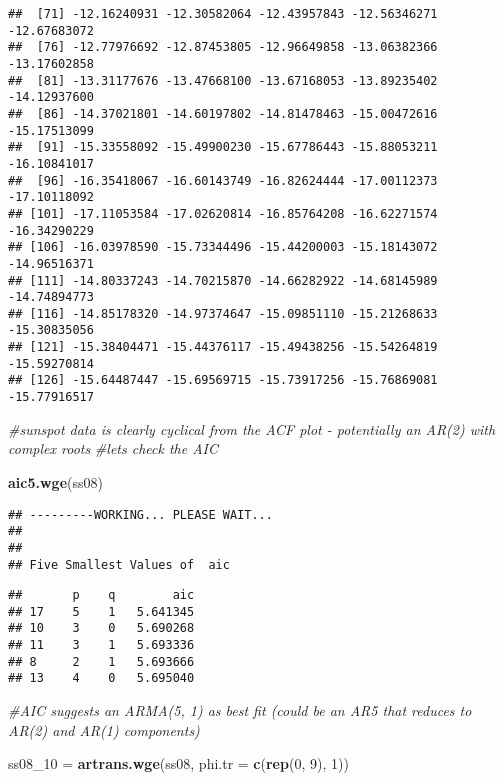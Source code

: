 \documentclass[]{article}
\newenvironment{Shaded}{\begin{snugshade}}{\end{snugshade}}
\newcommand{\CommentTok}[1]{\textcolor[rgb]{0.56,0.35,0.01}{\textit{#1}}}
\newcommand{\DataTypeTok}[1]{\textcolor[rgb]{0.13,0.29,0.53}{#1}}
\newcommand{\DecValTok}[1]{\textcolor[rgb]{0.00,0.00,0.81}{#1}}
\newcommand{\KeywordTok}[1]{\textcolor[rgb]{0.13,0.29,0.53}{\textbf{#1}}}
\newcommand{\NormalTok}[1]{#1}
\newcommand{\StringTok}[1]{\textcolor[rgb]{0.31,0.60,0.02}{#1}}
\begin{document}
\begin{verbatim}
##  [71] -12.16240931 -12.30582064 -12.43957843 -12.56346271 -12.67683072
##  [76] -12.77976692 -12.87453805 -12.96649858 -13.06382366 -13.17602858
##  [81] -13.31177676 -13.47668100 -13.67168053 -13.89235402 -14.12937600
##  [86] -14.37021801 -14.60197802 -14.81478463 -15.00472616 -15.17513099
##  [91] -15.33558092 -15.49900230 -15.67786443 -15.88053211 -16.10841017
##  [96] -16.35418067 -16.60143749 -16.82624444 -17.00112373 -17.10118092
## [101] -17.11053584 -17.02620814 -16.85764208 -16.62271574 -16.34290229
## [106] -16.03978590 -15.73344496 -15.44200003 -15.18143072 -14.96516371
## [111] -14.80337243 -14.70215870 -14.66282922 -14.68145989 -14.74894773
## [116] -14.85178320 -14.97374647 -15.09851110 -15.21268633 -15.30835056
## [121] -15.38404471 -15.44376117 -15.49438256 -15.54264819 -15.59270814
## [126] -15.64487447 -15.69569715 -15.73917256 -15.76869081 -15.77916517
\end{verbatim}

\begin{Shaded}
\begin{Highlighting}[]
\CommentTok{#sunspot data is clearly cyclical from the ACF plot - potentially an AR(2) with complex roots  }
\CommentTok{#lets check the AIC}

\KeywordTok{aic5.wge}\NormalTok{(ss08)}
\end{Highlighting}
\end{Shaded}

\begin{verbatim}
## ---------WORKING... PLEASE WAIT... 
## 
## 
## Five Smallest Values of  aic
\end{verbatim}

\begin{verbatim}
##       p    q        aic
## 17    5    1   5.641345
## 10    3    0   5.690268
## 11    3    1   5.693336
## 8     2    1   5.693666
## 13    4    0   5.695040
\end{verbatim}

\begin{Shaded}
\begin{Highlighting}[]
\CommentTok{#AIC suggests an ARMA(5, 1) as best fit (could be an AR5 that reduces to AR(2) and AR(1) components)}

\NormalTok{ss08_}\DecValTok{10}\NormalTok{ =}\StringTok{ }\KeywordTok{artrans.wge}\NormalTok{(ss08, }\DataTypeTok{phi.tr =} \KeywordTok{c}\NormalTok{(}\KeywordTok{rep}\NormalTok{(}\DecValTok{0}\NormalTok{, }\DecValTok{9}\NormalTok{), }\DecValTok{1}\NormalTok{))}
\end{Highlighting}
\end{Shaded}
\end{document}
